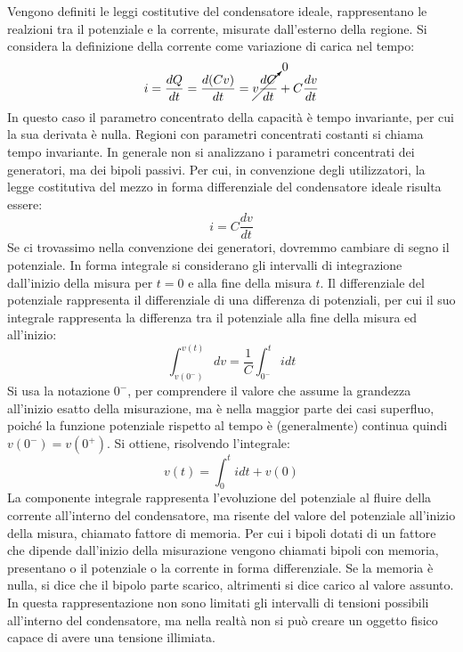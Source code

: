 \documentclass{article}
\numberwithin{equation}{subsection}
\begin{document}
Vengono definiti le leggi costitutive del condensatore ideale, rappresentano le realzioni tra il potenziale e la corrente, misurate dall'esterno della regione. 
Si considera la definizione della corrente come variazione di carica nel tempo:
\begin{equation*}
    i=\displaystyle\frac{dQ}{dt}=\frac{d(Cv)}{dt}=\cancelto{0}{v\frac{dC}{dt}}+C\frac{dv}{dt}
\end{equation*}
In questo caso il parametro concentrato della capacità è tempo invariante, per cui la sua derivata è nulla. Regioni con parametri concentrati costanti si chiama tempo 
invariante. In generale non si analizzano i parametri concentrati dei generatori, ma dei bipoli passivi. Per cui, in convenzione degli utilizzatori, la legge costitutiva del 
mezzo in forma differenziale del condensatore ideale risulta essere:
\begin{equation}
    i=\displaystyle C\frac{dv}{dt}
\end{equation}
Se ci trovassimo nella convenzione dei generatori, dovremmo cambiare di segno il potenziale. In forma integrale si considerano gli intervalli di integrazione dall'inizio 
della misura per $t=0$ e alla fine della misura $t$. Il differenziale del potenziale rappresenta il differenziale di una differenza di potenziali, per cui il suo integrale rappresenta la differenza tra il potenziale alla fine della misura ed all'inizio:
\begin{equation*}
    \displaystyle\int_{v(0^-)}^{v(t)}dv=\frac{1}{C}\int_{0^-}^tidt
\end{equation*}
Si usa la notazione $0^-$, per comprendere il valore che assume la grandezza all'inizio esatto della misurazione, ma è nella maggior parte dei casi superfluo, poiché la funzione 
potenziale rispetto al tempo è (generalmente) continua quindi $v(0^-)=v(0^+)$. Si ottiene, risolvendo l'integrale:
\begin{equation*}
    v(t)=\displaystyle\int_0^tidt+v(0)
\end{equation*}
La componente integrale rappresenta l'evoluzione del potenziale al fluire della corrente all'interno del condensatore, ma risente del valore del potenziale all'inizio della misura, 
chiamato fattore di memoria. Per cui i bipoli dotati di un fattore che dipende dall'inizio della misurazione vengono chiamati bipoli con memoria, presentano o il potenziale 
o la corrente in forma differenziale. Se la memoria è nulla, si dice che il bipolo parte scarico, altrimenti si dice carico al valore assunto. In questa rappresentazione non 
sono limitati gli intervalli di tensioni possibili all'interno del condensatore, ma nella realtà non si può creare un oggetto fisico capace di avere una tensione illimiata. 
\end{document}
